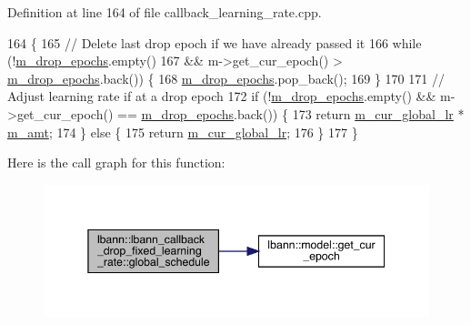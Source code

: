 Definition at line 164 of file callback\+\_\+learning\+\_\+rate.\+cpp.


\begin{DoxyCode}
164                                                                        \{
165   \textcolor{comment}{// Delete last drop epoch if we have already passed it}
166   \textcolor{keywordflow}{while} (!\hyperlink{classlbann_1_1lbann__callback__drop__fixed__learning__rate_afc99419c3d818fe86d5865c8f7beae49}{m\_drop\_epochs}.empty()
167          && m->get\_cur\_epoch() > \hyperlink{classlbann_1_1lbann__callback__drop__fixed__learning__rate_afc99419c3d818fe86d5865c8f7beae49}{m\_drop\_epochs}.back()) \{
168     \hyperlink{classlbann_1_1lbann__callback__drop__fixed__learning__rate_afc99419c3d818fe86d5865c8f7beae49}{m\_drop\_epochs}.pop\_back();
169   \}
170 
171   \textcolor{comment}{// Adjust learning rate if at a drop epoch}
172   \textcolor{keywordflow}{if} (!\hyperlink{classlbann_1_1lbann__callback__drop__fixed__learning__rate_afc99419c3d818fe86d5865c8f7beae49}{m\_drop\_epochs}.empty() && m->get\_cur\_epoch() == \hyperlink{classlbann_1_1lbann__callback__drop__fixed__learning__rate_afc99419c3d818fe86d5865c8f7beae49}{m\_drop\_epochs}.back()) \{
173     \textcolor{keywordflow}{return} \hyperlink{classlbann_1_1lbann__callback__learning__rate_a97194f282c29a748c915d9811a8a99fb}{m\_cur\_global\_lr} * \hyperlink{classlbann_1_1lbann__callback__drop__fixed__learning__rate_a3e38dc2b7dc92d29567091395de22546}{m\_amt};
174   \} \textcolor{keywordflow}{else} \{
175     \textcolor{keywordflow}{return} \hyperlink{classlbann_1_1lbann__callback__learning__rate_a97194f282c29a748c915d9811a8a99fb}{m\_cur\_global\_lr};
176   \}
177 \}
\end{DoxyCode}
Here is the call graph for this function\+:\nopagebreak
\begin{figure}[H]
\begin{center}
\leavevmode
\includegraphics[width=345pt]{classlbann_1_1lbann__callback__drop__fixed__learning__rate_a2ee62bfde00d7f1a4e55e4a334160fbe_cgraph}
\end{center}
\end{figure}
\mbox{\label{classlbann_1_1lbann__callback__drop__fixed__learning__rate_a715d550fb9ec99e32861f91299669c35}} 
